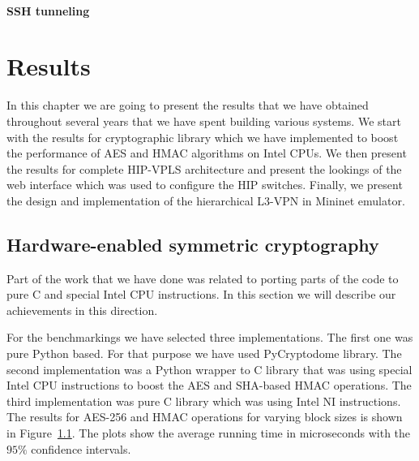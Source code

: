 \subsubsection{SSH tunneling}

\chapter{Results}

In this chapter we are going to present the results that we have obtained 
throughout several years that we have spent building various systems. We start 
with the results for cryptographic library which we have implemented to 
boost the performance of AES and HMAC algorithms on Intel CPUs. We then 
present the results for complete HIP-VPLS architecture and present the 
lookings of the web interface which was used to configure the HIP switches.
Finally, we present the design and implementation of the hierarchical L3-VPN
in Mininet emulator.  

\section{Hardware-enabled symmetric cryptography}

Part of the work that we have done was related to porting parts of the code to pure C 
and special Intel CPU instructions. In this section we will describe our achievements 
in this direction. 

For the benchmarkings we have selected three implementations. The first one was pure 
Python based. For that purpose we have used PyCryptodome library. The second implementation
was a Python wrapper to C library that was using special Intel CPU instructions to boost 
the AES and SHA-based HMAC operations. The third implementation was pure C library 
which was using Intel NI instructions. The results for AES-256 and HMAC operations 
for varying block sizes is shown in Figure~\ref{}. The plots show the average 
running time in microseconds with the $95\%$ confidence intervals. 

